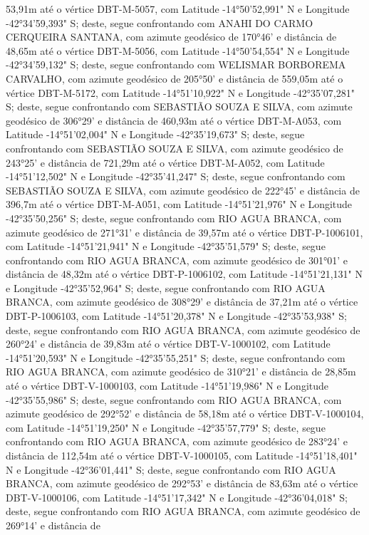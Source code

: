 53,91m  até o vértice DBT-M-5057, com Latitude -14°50'52,991" N e Longitude -42°34'59,393" S; deste, segue confrontando com ANAHI DO CARMO CERQUEIRA SANTANA, com azimute geodésico de 170°46' e distância de 
48,65m  até o vértice DBT-M-5056, com Latitude -14°50'54,554" N e Longitude -42°34'59,132" S; deste, segue confrontando com WELISMAR BORBOREMA CARVALHO, com azimute geodésico de 205°50' e distância de 
559,05m  até o vértice DBT-M-5172, com Latitude -14°51'10,922" N e Longitude -42°35'07,281" S; deste, segue confrontando com SEBASTIÃO SOUZA E SILVA, com azimute geodésico de 306°29' e distância de 
460,93m  até o vértice DBT-M-A053, com Latitude -14°51'02,004" N e Longitude -42°35'19,673" S; deste, segue confrontando com SEBASTIÃO SOUZA E SILVA, com azimute geodésico de 243°25' e distância de 
721,29m  até o vértice DBT-M-A052, com Latitude -14°51'12,502" N e Longitude -42°35'41,247" S; deste, segue confrontando com SEBASTIÃO SOUZA E SILVA, com azimute geodésico de 222°45' e distância de 
396,7m  até o vértice DBT-M-A051, com Latitude -14°51'21,976" N e Longitude -42°35'50,256" S; deste, segue confrontando com RIO AGUA BRANCA, com azimute geodésico de 271°31' e distância de 
39,57m  até o vértice DBT-P-1006101, com Latitude -14°51'21,941" N e Longitude -42°35'51,579" S; deste, segue confrontando com RIO AGUA BRANCA, com azimute geodésico de 301°01' e distância de 
48,32m  até o vértice DBT-P-1006102, com Latitude -14°51'21,131" N e Longitude -42°35'52,964" S; deste, segue confrontando com RIO AGUA BRANCA, com azimute geodésico de 308°29' e distância de 
37,21m  até o vértice DBT-P-1006103, com Latitude -14°51'20,378" N e Longitude -42°35'53,938" S; deste, segue confrontando com RIO AGUA BRANCA, com azimute geodésico de 260°24' e distância de 
39,83m  até o vértice DBT-V-1000102, com Latitude -14°51'20,593" N e Longitude -42°35'55,251" S; deste, segue confrontando com RIO AGUA BRANCA, com azimute geodésico de 310°21' e distância de 
28,85m  até o vértice DBT-V-1000103, com Latitude -14°51'19,986" N e Longitude -42°35'55,986" S; deste, segue confrontando com RIO AGUA BRANCA, com azimute geodésico de 292°52' e distância de 
58,18m  até o vértice DBT-V-1000104, com Latitude -14°51'19,250" N e Longitude -42°35'57,779" S; deste, segue confrontando com RIO AGUA BRANCA, com azimute geodésico de 283°24' e distância de 
112,54m  até o vértice DBT-V-1000105, com Latitude -14°51'18,401" N e Longitude -42°36'01,441" S; deste, segue confrontando com RIO AGUA BRANCA, com azimute geodésico de 292°53' e distância de 
83,63m  até o vértice DBT-V-1000106, com Latitude -14°51'17,342" N e Longitude -42°36'04,018" S; deste, segue confrontando com RIO AGUA BRANCA, com azimute geodésico de 269°14' e distância de 
